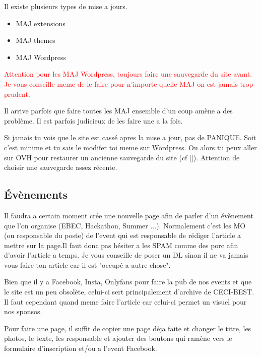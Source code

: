 \documentclass[12pt]{article}
\begin{document}
	 	 Il existe plusieurs types de mise a jours.
	 	 \begin{itemize}
	 	 	\item MAJ extensions
	 	 	\item MAJ themes
	 	 	\item MAJ Wordpress
	 	 \end{itemize}
	 	 
	 	 \textcolor{red}{Attention pour les MAJ Wordpress, toujours faire une sauvegarde du site avant. Je vous conseille meme de le faire pour n'importe quelle MAJ on est jamais trop prudent.}
	 	 
	 	 Il arrive parfois que faire toutes les MAJ ensemble d'un coup amène a des problème. Il est parfois judicieux de les faire une a la fois.
	 	 
	 	 Si jamais tu vois que le site est cassé apres la mise a jour, pas de PANIQUE. Soit c'est minime et tu sais le modifer toi meme sur Wordpress. Ou alors tu peux aller sur OVH pour restaurer un ancienne sauvegarde du site (cf \autoref{}). Attention de choisir une sauvegarde assez récente.
	 	 
	 \subsection{Évènements}
	 	Il faudra a certain moment crée une nouvelle page afin de parler d'un évènement que l'on organise (EBEC, Hackathon, Summer ...). Normalement c'est les MO (ou responsable du poste) de l'event qui est responsable de rédiger l'article a mettre sur la page.Il faut donc pas hésiter a les SPAM comme des porc afin d'avoir l'article a temps. Je vous conseille de poser un DL sinon il ne va jamais vous faire ton article car il est "occupé a autre chose".
	 	
	 	Bien que il y a Facebook, Insta, Onlyfans pour faire la pub de nos events et que le site est un peu obsolète, celui-ci sert principalement d'archive de CECI-BEST. Il faut cependant quand meme faire l'article car celui-ci permet un visuel pour nos sponsos.
	 	
	 	Pour faire une page, il suffit de copier une page déja faite et changer le titre, les photos, le texte, les responsable et ajouter des boutons qui ramène vers le formulaire d'inscription et/ou a l'event Facebook.
	 	 
\end{document}
